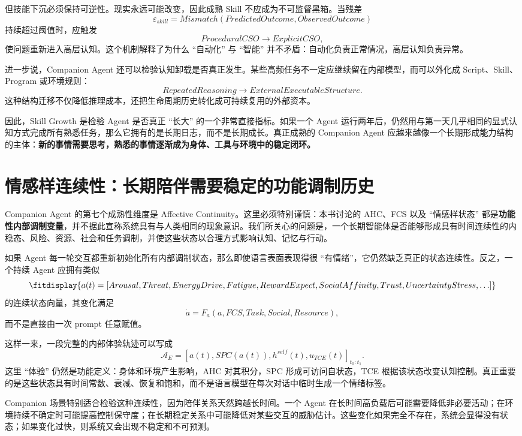 但技能下沉必须保持可逆性。现实永远可能改变，因此成熟 Skill 不应成为不可监督黑箱。当残差
\[
\varepsilon_{skill}
=
Mismatch
\left(
PredictedOutcome,
ObservedOutcome
\right)
\]
持续超过阈值时，应触发
\[
ProceduralCSO
\rightarrow
ExplicitCSO,
\]
使问题重新进入高层认知。这个机制解释了为什么 ``自动化'' 与 ``智能'' 并不矛盾：自动化负责正常情况，高层认知负责异常。

进一步说，Companion Agent 还可以检验认知卸载是否真正发生。某些高频任务不一定应继续留在内部模型，而可以外化成 Script、Skill、Program 或环境规则：
\[
RepeatedReasoning
\rightarrow
ExternalExecutableStructure.
\]
这种结构迁移不仅降低推理成本，还把生命周期历史转化成可持续复用的外部资本。

因此，Skill Growth 是检验 Agent 是否真正 ``长大'' 的一个非常直接指标。如果一个 Agent 运行两年后，仍然用与第一天几乎相同的显式认知方式完成所有熟悉任务，那么它拥有的是长期日志，而不是长期成长。真正成熟的 Companion Agent 应越来越像一个长期形成能力结构的主体：\textbf{新的事情需要思考，熟悉的事情逐渐成为身体、工具与环境中的稳定闭环。}

\section{情感样连续性：长期陪伴需要稳定的功能调制历史}

Companion Agent 的第七个成熟性维度是 Affective Continuity。这里必须特别谨慎：本书讨论的 AHC、FCS 以及 ``情感样状态'' 都是\textbf{功能性内部调制变量}，并不据此宣称系统具有与人类相同的现象意识。我们所关心的问题是，一个长期智能体是否能够形成具有时间连续性的内稳态、风险、资源、社会和任务调制，并使这些状态以合理方式影响认知、记忆与行动。

如果 Agent 每一轮交互都重新初始化所有内部调制状态，那么即使语言表面表现得很 ``有情绪''，它仍然缺乏真正的状态连续性。反之，一个持续 Agent 应拥有类似
\[
\fitdisplay{
a(t)
=
[
Arousal,
Threat,
EnergyDrive,
Fatigue,
RewardExpect,
SocialAffinity,
Trust,
UncertaintyStress,\ldots]
}
\]
的连续状态向量，其变化满足
\[
\dot a
=
F_a
\left(
a,FCS,Task,Social,Resource
\right),
\]
而不是直接由一次 prompt 任意赋值。

这样一来，一段完整的内部体验轨迹可以写成
\[
\mathcal A_E
=
\left[
a(t),
SPC(a(t)),
h^{self}(t),
u_{TCE}(t)
\right]_{t_0:t_1}.
\]
这里 ``体验'' 仍然是功能定义：身体和环境产生影响，AHC 对其积分，SPC 形成可访问自状态，TCE 根据该状态改变认知控制。真正重要的是这些状态具有时间常数、衰减、恢复和饱和，而不是语言模型在每次对话中临时生成一个情绪标签。

Companion 场景特别适合检验这种连续性，因为陪伴关系天然跨越长时间。一个 Agent 在长时间高负载后可能需要降低非必要活动；在环境持续不确定时可能提高控制保守度；在长期稳定关系中可能降低对某些交互的威胁估计。这些变化如果完全不存在，系统会显得没有状态；如果变化过快，则系统又会出现不稳定和不可预测。

